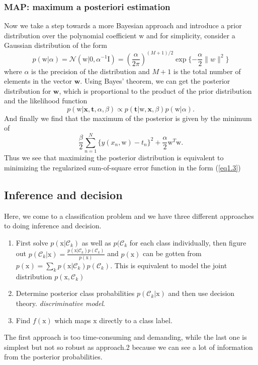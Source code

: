 \documentclass{article}
\newcommand{\normD}{\mathcal{N}}
\newcommand{\mrm}{\mathrm}
\newcommand{\mbf}{\mathbf}
\begin{document}
\subsubsection*{MAP: maximum a posteriori estimation}
Now we take a step towards a more Bayesian approach and introduce a prior distribution over the polynomial coefficient $\mrm w$ and for simplicity, consider a Gaussian distribution of the form 
\begin{equation}
    p(\mrm w|\alpha) = \normD(\mrm w|0,\alpha^{-1}\mrm I) = (\frac\alpha{2\pi})^{(M+1)/2}\exp\{-\frac\alpha2\|w\|^2\} \tag{1.9}
\end{equation}
where $\alpha$ is the precision of the distribution and $M+1$ is the total number of elements in the vector $\mbf w$. Using Bayes' theorem, we can get the posterior distribution for $\mbf w$, which is proportional to the product of the prior distribution and the likelihood function 
\begin{equation}
    p(\mrm w| \mbf x, \mbf t,\alpha, \beta) \propto p(\mbf t|\mrm w, \mbf x, \beta)p(\mrm w|\alpha).  \tag{1.10}
\end{equation}
And finally we find that the maximum of the posterior is given by the minimum of 
\begin{equation}
    \frac\beta2\sum_{n=1}^N\{y(x_n,\mrm w) -t_n\}^2+\frac\alpha2\mrm w^T\mrm w. \tag{1.11}
\end{equation}
Thus we see that maximizing the posterior distribution is equivalent to minimizing the regularized sum-of-square error function in the form (\ref{eq1.3})

\subsection*{Inference and decision}
Here, we come to a classification problem and we have three different approaches to doing inference and decision.
\begin{enumerate}
    \item First solve $p(\mrm{x}|\mathcal C_k)$ as well as $p(\mathcal C_k$ for each class individually, then figure out $p(\mathcal C_k|\mrm x) = \frac{p(\mathrm x|\mathcal C_k)p(\mathcal C_k)}{p(\mrm x)}$ and $p(\mrm x)$ can be gotten from $p(\mrm x) = \sum_kp(\mrm x|\mathcal C_k)p(\mathcal C_k)$. This is equivalent to model the joint distribution $p(\mrm x, \mathcal C_k)$
  \item Determine posterior class probabilities $p(\mathcal C_k|\mrm x)$  and then use decision theory.  \emph{discriminative model}.
  \item Find $f(\mathrm x)$ which maps $\mrm{x}$ directly to a class label.
\end{enumerate}
The first approach is too time-consuming and demanding, while the last one is simplest but not so robust as approach.2 because we can see a lot of information from the posterior probabilities.
\end{document}
